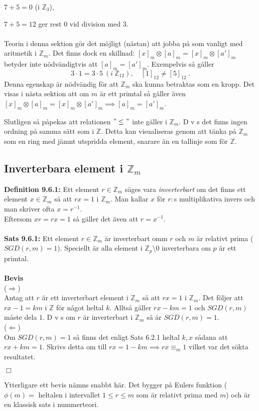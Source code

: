 \documentclass{article}
\begin{document}
$7+5=0$ (i $\mathbb{Z}_3$),

$7+5=12$ ger rest $0$ vid division med $3$.
\\ \\
Teorin i denna sektion gör det möjligt (nästan) att jobba på som vanligt med aritmetik i $\mathbb{Z}_m$. Det finns dock en skillnad: $[x]_m\otimes[a]_m=[x]_m\otimes[a']_m$ betyder inte nödvändigtvis att $[a]_m=[a']_m$. Exempelvis så gäller
$$
3\cdot1=3\cdot5 \ (i \ \mathbb{Z}_{12}), \quad [1]_{12}\neq[5]_{12} \ .
$$
Denna egenskap är nödvändig för att $\mathbb{Z}_m$ ska kunna betraktas som en kropp. Det visas i nästa sektion att om $m$ är ett primtal så gäller även $[x]_m\otimes[a]_m=[x]_m\otimes[a']_m\implies [a]_m=[a']_m$.

Slutligen så påpekas att relationen $"\leq"$ inte gäller i $\mathbb{Z}_m$. D v s det finns ingen ordning på samma sätt som i $\mathbb{Z}$. Detta kan visualiseras genom att tänka på $\mathbb{Z}_m$ som en ring med jämnt utspridda element, snarare än en tallinje som för $\mathbb{Z}$.

\subsection{Inverterbara element i $\mathbb{Z}_m$}
\vspace{0.5 cm}
\textbf{Definition 9.6.1:} Ett element $r\in\mathbb{Z}_m$ säges vara \textit{inverterbart} om det finns ett element $x\in\mathbb{Z}_m$ så att $rx=1$ i $\mathbb{Z}_m$. Man kallar $x$ för $r:$s multiplikativa invers och man skriver ofta $x=r^{-1}$.\\

Eftersom $xr=rx=1$ så gäller det även att $r=x^{-1}$.\\ \\
\textbf{Sats 9.6.1:} Ett element $r\in\mathbb{Z}_m$ är inverterbart omm $r$ och $m$ är relativt prima ($SGD(r,m)=1$). Speciellt är alla element i $\mathbb{Z}_p\setminus0$ inverterbara om $p$ är ett primtal.\\ \\
\textbf{Bevis}\\
($\Rightarrow$)\\
Antag att $r$ är ett inverterbart element i $\mathbb{Z}_m$ så att $rx=1$ i $\mathbb{Z}_m$. Det följer att $rx-1=km$ i $\mathbb{Z}$ för något heltal $k$. Alltså gäller $rx-km=1$ och $SGD(r,m)$ måste dela $1$. D v s om $r$ är inverterbart i $\mathbb{Z}_m$ så är $SGD(r,m)=1$.\\
($\Leftarrow$)\\
Om $SGD(r,m)=1$ så finns det enligt Sats 6.2.1 heltal $k,x$ sådana att $rx+km=1$. Skrivs detta om till $rx=1-km\implies rx\equiv_m1$ vilket var det sökta resultatet.
\begin{flushright}
$\Box$
\end{flushright}
Ytterligare ett bevis nämns snabbt här. Det bygger på Eulers funktion ($\phi(m)=$ heltalen i intervallet $1\leq r\leq m$ som är relativt prima med $m$) och är en klassisk sats i nummerteori.
\end{document}
